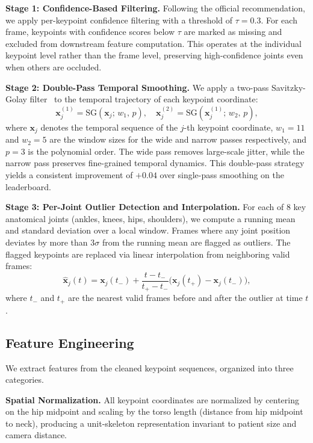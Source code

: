 \noindent\textbf{Stage 1: Confidence-Based Filtering.}
Following the official recommendation, we apply per-keypoint confidence filtering with a threshold of $\tau = 0.3$. For each frame, keypoints with confidence scores below $\tau$ are marked as missing and excluded from downstream feature computation. This operates at the individual keypoint level rather than the frame level, preserving high-confidence joints even when others are occluded.

\noindent\textbf{Stage 2: Double-Pass Temporal Smoothing.}
We apply a two-pass Savitzky-Golay filter~\cite{savitzky1964smoothing} to the temporal trajectory of each keypoint coordinate:
\begin{equation}
    \mathbf{x}_j^{(1)} = \text{SG}(\mathbf{x}_j;\, w_1,\, p), \quad \mathbf{x}_j^{(2)} = \text{SG}(\mathbf{x}_j^{(1)};\, w_2,\, p),
\end{equation}
where $\mathbf{x}_j$ denotes the temporal sequence of the $j$-th keypoint coordinate, $w_1 = 11$ and $w_2 = 5$ are the window sizes for the wide and narrow passes respectively, and $p = 3$ is the polynomial order. The wide pass removes large-scale jitter, while the narrow pass preserves fine-grained temporal dynamics. This double-pass strategy yields a consistent improvement of $+0.04$ over single-pass smoothing on the leaderboard.

\noindent\textbf{Stage 3: Per-Joint Outlier Detection and Interpolation.}
For each of 8 key anatomical joints (ankles, knees, hips, shoulders), we compute a running mean and standard deviation over a local window. Frames where any joint position deviates by more than $3\sigma$ from the running mean are flagged as outliers. The flagged keypoints are replaced via linear interpolation from neighboring valid frames:
\begin{equation}
    \hat{\mathbf{x}}_j(t) = \mathbf{x}_j(t_-) + \frac{t - t_-}{t_+ - t_-} \bigl(\mathbf{x}_j(t_+) - \mathbf{x}_j(t_-)\bigr),
\end{equation}
where $t_-$ and $t_+$ are the nearest valid frames before and after the outlier at time $t$.

\subsection{Feature Engineering}
\label{sec:features}

We extract features from the cleaned keypoint sequences, organized into three categories.

\noindent\textbf{Spatial Normalization.}
All keypoint coordinates are normalized by centering on the hip midpoint and scaling by the torso length (distance from hip midpoint to neck), producing a unit-skeleton representation invariant to patient size and camera distance.

